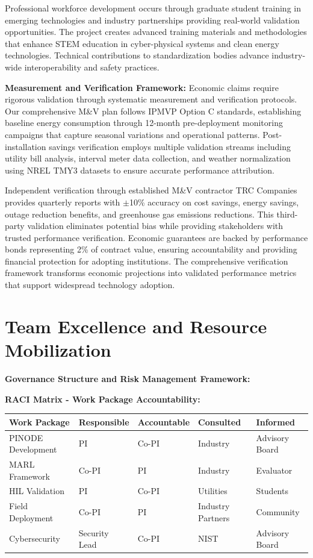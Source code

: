 \documentclass[12pt]{article}
\begin{document}
Professional workforce development occurs through graduate student training in emerging technologies and industry partnerships providing real-world validation opportunities. The project creates advanced training materials and methodologies that enhance STEM education in cyber-physical systems and clean energy technologies. Technical contributions to standardization bodies advance industry-wide interoperability and safety practices.


\textbf{Measurement and Verification Framework:} Economic claims require rigorous validation through systematic measurement and verification protocols. Our comprehensive M\&V plan follows IPMVP Option C standards, establishing baseline energy consumption through 12-month pre-deployment monitoring campaigns that capture seasonal variations and operational patterns. Post-installation savings verification employs multiple validation streams including utility bill analysis, interval meter data collection, and weather normalization using NREL TMY3 datasets to ensure accurate performance attribution.

Independent verification through established M\&V contractor TRC Companies provides quarterly reports with $\pm$10\% accuracy on cost savings, energy savings, outage reduction benefits, and greenhouse gas emissions reductions. This third-party validation eliminates potential bias while providing stakeholders with trusted performance verification. Economic guarantees are backed by performance bonds representing 2\% of contract value, ensuring accountability and providing financial protection for adopting institutions. The comprehensive verification framework transforms economic projections into validated performance metrics that support widespread technology adoption.

\section{Team Excellence and Resource Mobilization}

\textbf{Governance Structure and Risk Management Framework:}

\textbf{RACI Matrix - Work Package Accountability:}

\begin{center}
\footnotesize
\begin{tabular}{|p{2.5cm}|p{1.5cm}|p{1.5cm}|p{1.5cm}|p{1.8cm}|}
\hline
\textbf{Work Package} & \textbf{Responsible} & \textbf{Accountable} & \textbf{Consulted} & \textbf{Informed} \\
\hline
PINODE Development & PI & Co-PI & Industry & Advisory Board \\
MARL Framework & Co-PI & PI & Industry & Evaluator \\
HIL Validation & PI & Co-PI & Utilities & Students \\
Field Deployment & Co-PI & PI & Industry Partners & Community \\
Cybersecurity & Security Lead & Co-PI & NIST & Advisory Board \\
\hline
\end{tabular}
\end{center}
\end{document}
